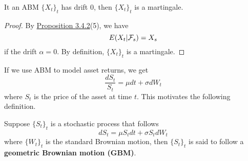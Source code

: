 \documentclass[11pt,fleqn]{book} %
\begin{document}
\begin{corollary} \label{cor:343}
It an ABM \(\{X_t\}_t\) has drift 0, then \(\{X_t\}_t\) is a martingale.
\end{corollary}
\begin{proof}
By \hyperref[prop:342]{Proposition 3.4.2}(5), we have
\[
E(X_t | \mathcal{F}_s) = X_s
\]
if the drift \(\alpha = 0\). By definition, \(\{X_t\}_t\) is a martingale.
\end{proof}

\begin{remark} \label{rmk:344}
If we use ABM to model asset returns, we get
\[
\frac{dS_t}{S_t} = \mu dt + \sigma dW_t
\]
where \(S_t\) is the price of the asset at time \(t\). This motivates  the following definition.
\end{remark}

\begin{definition} \label{def:345}
Suppose \(\{S_t\}_t\) is a stochastic process that follows
\[
dS_t = \mu S_tdt + \sigma S_t dW_t
\]
where \(\{W_t\}_t\) is the standard Brownian motion, then \(\{S_t\}_t\) is said to follow a \textbf{geometric Brownian motion (GBM)}.
\end{definition}
\end{document}
